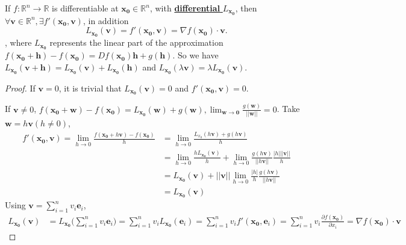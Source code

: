 \begin{proposition}
    If $f: \mathbb{R}^{n} \to \mathbb{R}$ is differentiable at $\mathbf{x_0}\in \mathbb{R}^{n}$, with \underline{\textbf{differential} $L_\mathbf{x_0}$}, then $\forall \mathbf{v} \in \mathbb{R}^{n}, \exists f'(\mathbf{x_0}, \mathbf{v})$, in addition \[
        L_\mathbf{x_0}(\mathbf{v}) = f'(\mathbf{x_0},\mathbf{v})= \nabla f(\mathbf{x_0}) \cdot \mathbf{v}.
    \]
    , where $L_\mathbf{x_0}$ represents the linear part of the approximation $f(\mathbf{x_0}+\mathbf{h})-f(\mathbf{x_0}) = Df(\mathbf{x_0})\mathbf{h}+g(\mathbf{h})$. So we have $L_\mathbf{x_0}(\mathbf{v} + \mathbf{h})= L_\mathbf{x_0}(\mathbf{v})+L_\mathbf{x_0}(\mathbf{h})$ and $L_\mathbf{x_0}(\lambda \mathbf{v})=\lambda L_\mathbf{x_0}(\mathbf{v})$.
\end{proposition}

\begin{proof}
    If $\mathbf{v} = 0$, it is trivial that $L_{\mathbf{x_0}}(\mathbf{v}) = 0$ and $f'(\mathbf{x_0},\mathbf{v}) = 0$.

    If $\mathbf{v} \neq 0$, $f(\mathbf{x_0} + \mathbf{w}) - f(\mathbf{x_0})= L_\mathbf{x_0}(\mathbf{w}) + g(\mathbf{w}), \lim_{\mathbf{w} \to \mathbf{0}} \frac{g(\mathbf{w})}{||\mathbf{w}||} = 0$. Take $\mathbf{w} = h \mathbf{v} (h \neq 0)$, \begin{align*}
        f'(\mathbf{x_0},\mathbf{v}) = \lim_{h \to 0} \frac{f(\mathbf{x_0}+h \mathbf{v}) - f(\mathbf{x_0})}{h}
         & = \lim_{h \to 0} \frac{L_{x_0}(h \mathbf{v}) + g(h \mathbf{v})}{h}                                                                           \\
         & =\lim_{h \to 0} \frac{h L_\mathbf{x_0}(\mathbf{v})}{h} + \lim_{h \to 0} \frac{g(h \mathbf{v})}{||h \mathbf{v}||} \frac{|h|||\mathbf{v}||}{h} \\
         & = L_\mathbf{x_0}(\mathbf{v}) + ||\mathbf{v}|| \lim_{h \to 0} \frac{|h|}{h}\frac{g(h \mathbf{v})}{||h \mathbf{v}||}                           \\
         & = L_\mathbf{x_0}(\mathbf{v})
    \end{align*}
    Using $\mathbf{v} = \sum_{i=1}^{n} v_i \mathbf{e}_i$, \begin{align*}
        L_\mathbf{x_0}(\mathbf{v}) & = L_\mathbf{x_0}\Big(\sum_{i=1}^{n} v_i \mathbf{e}_i \Big) = \sum_{i=1}^{n} v_i L_\mathbf{x_0}(\mathbf{e}_i) = \sum_{i=1}^{n} v_i f'(\mathbf{x_0}, \mathbf{e}_i) = \sum_{i=1}^{n} v_i \frac{\partial f(\mathbf{x_0})}{\partial x_i} = \nabla f(\mathbf{x_0}) \cdot  \mathbf{v}
    \end{align*}
\end{proof}

